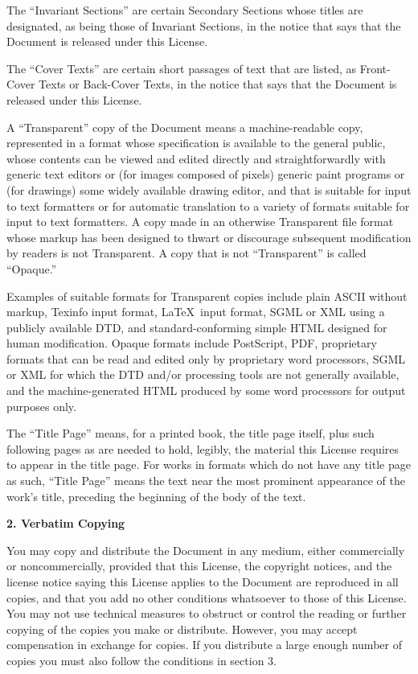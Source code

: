 \documentclass{doc}
\begin{document}
The ``Invariant Sections'' are certain Secondary Sections whose titles
are designated, as being those of Invariant Sections, in the notice
that says that the Document is released under this License.

The ``Cover Texts'' are certain short passages of text that are listed,
as Front-Cover Texts or Back-Cover Texts, in the notice that says that
the Document is released under this License.

A ``Transparent'' copy of the Document means a machine-readable copy,
represented in a format whose specification is available to the
general public, whose contents can be viewed and edited directly and
straightforwardly with generic text editors or (for images composed of
pixels) generic paint programs or (for drawings) some widely available
drawing editor, and that is suitable for input to text formatters or
for automatic translation to a variety of formats suitable for input
to text formatters.  A copy made in an otherwise Transparent file
format whose markup has been designed to thwart or discourage
subsequent modification by readers is not Transparent.  A copy that is
not ``Transparent'' is called ``Opaque.''

Examples of suitable formats for Transparent copies include plain
ASCII without markup, Texinfo input format, \LaTeX~input format, SGML
or XML using a publicly available DTD, and standard-conforming simple
HTML designed for human modification.  Opaque formats include
PostScript, PDF, proprietary formats that can be read and edited only
by proprietary word processors, SGML or XML for which the DTD and/or
processing tools are not generally available, and the
machine-generated HTML produced by some word processors for output
purposes only.

The ``Title Page'' means, for a printed book, the title page itself,
plus such following pages as are needed to hold, legibly, the material
this License requires to appear in the title page.  For works in
formats which do not have any title page as such, ``Title Page'' means
the text near the most prominent appearance of the work's title,
preceding the beginning of the body of the text.


\noindent\textbf{2. Verbatim Copying}

You may copy and distribute the Document in any medium, either
commercially or noncommercially, provided that this License, the
copyright notices, and the license notice saying this License applies
to the Document are reproduced in all copies, and that you add no other
conditions whatsoever to those of this License.  You may not use
technical measures to obstruct or control the reading or further
copying of the copies you make or distribute.  However, you may accept
compensation in exchange for copies.  If you distribute a large enough
number of copies you must also follow the conditions in section 3.
\end{document}
